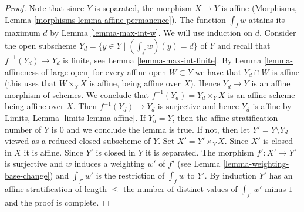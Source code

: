 \documentclass[10pt,a4paper]{amsart}
\theoremstyle{plain}
\theoremstyle{definition}
\theoremstyle{remark}
\numberwithin{equation}{subsection}
\begin{document}
\begin{proof}
Note that since $Y$ is separated, the morphism $X \to Y$ is affine
(Morphisms, Lemma \ref{morphisms-lemma-affine-permanence}).
The function $\int_f w$ attains its maximum $d$ by
Lemma \ref{lemma-max-int-w}. We will use induction on $d$.
Consider the open subscheme $Y_d = \{y \in Y \mid (\int_f w)(y) = d\}$
of $Y$ and recall that $f^{-1}(Y_d) \to Y_d$ is finite, see
Lemma \ref{lemma-max-int-finite}.
By Lemma \ref{lemma-affineness-of-large-open}
for every affine open $W \subset Y$ we have that $Y_d \cap W$ is affine
(this uses that $W \times_Y X$ is affine, being affine over $X$).
Hence $Y_d \to Y$ is an affine morphism of schemes. We
conclude that $f^{-1}(Y_d) = Y_d \times_Y X$ is
an affine scheme being affine over $X$.
Then $f^{-1}(Y_d) \to Y_d$ is surjective and
hence $Y_d$ is affine by Limits, Lemma \ref{limits-lemma-affine}.
If $Y_d = Y$, then the affine stratification number of $Y$ is $0$
and we conclude the lemma is true. If not, then let
$Y' = Y \setminus Y_d$ viewed as a reduced closed subscheme of $Y$.
Set $X' = Y' \times_Y X$.
Since $X'$ is closed in $X$ it is affine. Since
$Y'$ is closed in $Y$ it is separated.
The morphism $f' : X' \to Y'$ is surjective and
$w$ induces a weighting $w'$ of $f'$ (see
Lemma \ref{lemma-weighting-base-change}) and
$\int_{f'} w'$ is the restriction of $\int_f w$ to $Y'$.
By induction $Y'$ has an affine stratification of
length $\leq$ the number of distinct values of
$\int_{f'} w'$ minus $1$ and the proof is complete.
\end{proof}
\end{document}
